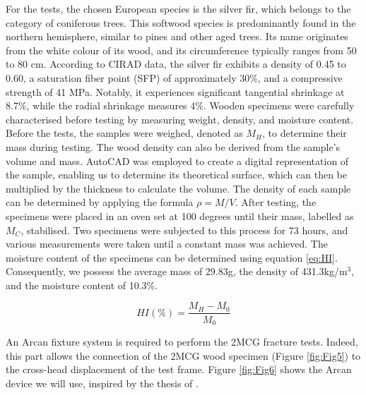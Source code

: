 \documentclass[3p,times,procedia]{elsarticle}
\begin{document}
For the tests, the chosen European species is the silver fir, which belongs to the category of coniferous trees. This softwood species is predominantly found in the northern hemisphere, similar to pines and other aged trees. Its name originates from the white colour of its wood, and its circumference typically ranges from 50 to 80 cm. According to CIRAD data, the silver fir exhibits a density of 0.45 to 0.60, a saturation fiber point (SFP) of approximately 30\%, and a compressive strength of 41 MPa. Notably, it experiences significant tangential shrinkage at 8.7\%, while the radial shrinkage measures 4\%. 
Wooden specimens were carefully characterised before testing by measuring weight, density, and moisture content. Before the tests, the samples were weighed, denoted as $M_H$, to determine their mass during testing. The wood density can also be derived from the sample's volume and mass. AutoCAD was employed to create a digital representation of the sample, enabling us to determine its theoretical surface, which can then be multiplied by the thickness to calculate the volume. The density of each sample can be determined by applying the formula $\rho = M/V$.
After testing, the specimens were placed in an oven set at 100 degrees until their mass, labelled as $M_C$, stabilised. Two specimens were subjected to this process for 73 hours, and various measurements were taken until a constant mass was achieved. The moisture content of the specimens can be determined using equation \ref{eq:HI}. Consequently, we possess the average mass of 29.83g, the density of 431.3kg/m$^3$, and the moisture content of 10.3\%.

\begin{equation}
	HI(\%) = \frac{M_{H}-M_{0}}{M_{0}}
	\label{eq:HI}
\end{equation}

An Arcan fixture system is required to perform the  2MCG fracture tests. Indeed, this part allows the connection of the 2MCG wood specimen (Figure \ref{fig:Fig5}) to the cross-head displacement of the test frame. Figure \ref{fig:Fig6} shows the Arcan device we will use, inspired by the thesis of \citep{Odounga2018phd}.
\end{document}
